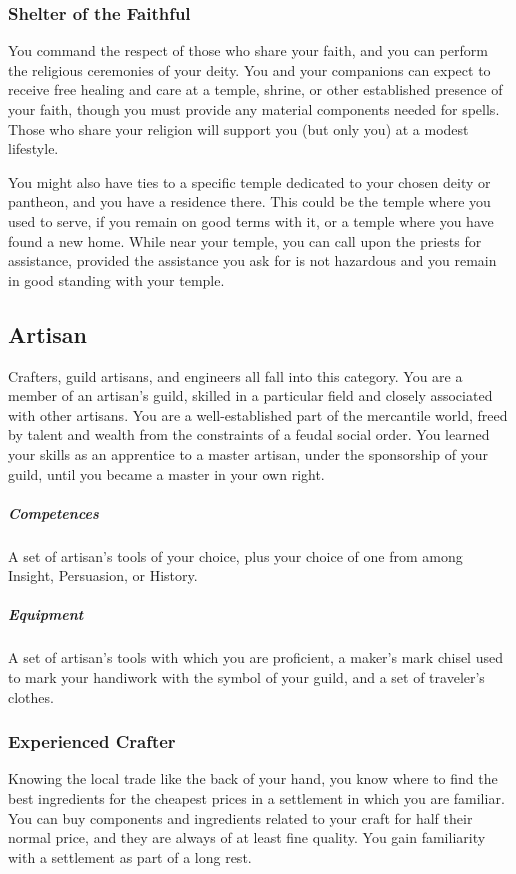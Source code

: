     \subsubsection{Shelter of the Faithful} \label{feat::shelterofthefaithful}
        You command the respect of those who share your faith, and you can perform the religious ceremonies of your deity.
        You and your companions can expect to receive free healing and care at a temple, shrine, or other established presence of your faith, though you must provide any material components needed for spells.
        Those who share your religion will support you (but only you) at a modest lifestyle.

        You might also have ties to a specific temple dedicated to your chosen deity or pantheon, and you have a residence there.
        This could be the temple where you used to serve, if you remain on good terms with it, or a temple where you have found a new home.
        While near your temple, you can call upon the priests for assistance, provided the assistance you ask for is not hazardous and you remain in good standing with your temple.

\subsection*{Artisan} \label{ssec::artisan}
    Crafters, guild artisans, and engineers all fall into this category.
    You are a member of an artisan's guild, skilled in a particular field and closely associated with other artisans.
    You are a well-established part of the mercantile world, freed by talent and wealth from the constraints of a feudal social order.
    You learned your skills as an apprentice to a master artisan, under the sponsorship of your guild, until you became a master in your own right.
    \subparagraph{Competences} A set of artisan's tools of your choice, plus your choice of one from among Insight, Persuasion, or History.
    \subparagraph{Equipment} A set of artisan's tools with which you are proficient, a maker's mark chisel used to mark your handiwork with the symbol of your guild, and a set of traveler's clothes.
    \subsubsection{Experienced Crafter} \label{feat::experiencedcrafter}
        Knowing the local trade like the back of your hand, you know where to find the best ingredients for the cheapest prices in a settlement in which you are familiar.
        You can buy components and ingredients related to your craft for half their normal price, and they are always of at least fine quality.
        You gain familiarity with a settlement as part of a long rest.

